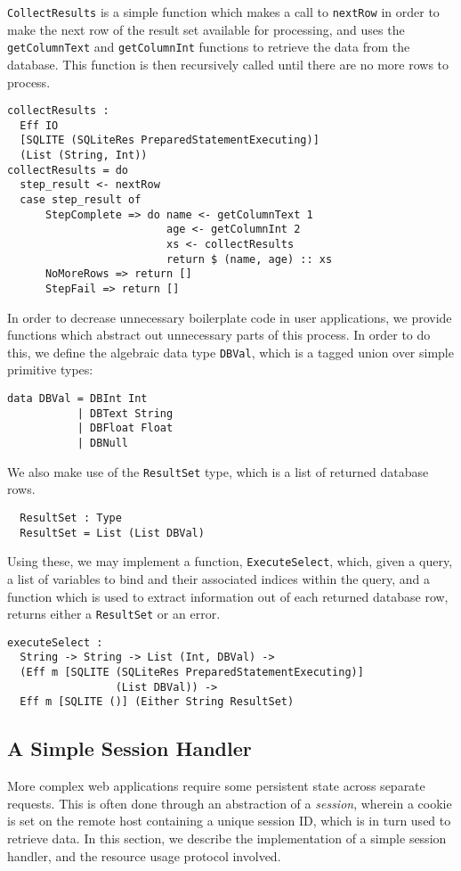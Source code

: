 \documentclass[preprint]{sigplanconf}
\begin{document}
\texttt{CollectResults} is a simple function which makes a call to \texttt{nextRow} in order to make the next row of the result set available for processing, and uses the \texttt{getColumnText} and \texttt{getColumnInt} functions to retrieve the data from the database. This function is then recursively called until there are no more rows to process.
\begin{Verbatim}
collectResults : 
  Eff IO 
  [SQLITE (SQLiteRes PreparedStatementExecuting)] 
  (List (String, Int))
collectResults = do
  step_result <- nextRow
  case step_result of
      StepComplete => do name <- getColumnText 1
                         age <- getColumnInt 2
                         xs <- collectResults
                         return $ (name, age) :: xs
      NoMoreRows => return []
      StepFail => return [] 
\end{Verbatim}
In order to decrease unnecessary boilerplate code in user applications, we provide functions which abstract out unnecessary parts of this process. In order to do this, we define the algebraic data type \texttt{DBVal}, which is a tagged union over simple primitive types:
\begin{Verbatim}
data DBVal = DBInt Int
           | DBText String
           | DBFloat Float
           | DBNull
\end{Verbatim}
We also make use of the \texttt{ResultSet} type, which is a list of returned database rows.
\begin{Verbatim}
  ResultSet : Type
  ResultSet = List (List DBVal)
\end{Verbatim}
Using these, we may implement a function, \texttt{ExecuteSelect}, which, given a query, a list of variables to bind and their associated indices within the query, and a function which is used to extract information out of each returned database row, returns either a \texttt{ResultSet} or an error.
\begin{Verbatim}
executeSelect : 
  String -> String -> List (Int, DBVal) -> 
  (Eff m [SQLITE (SQLiteRes PreparedStatementExecuting)] 
                 (List DBVal)) -> 
  Eff m [SQLITE ()] (Either String ResultSet)
\end{Verbatim}
\subsection{A Simple Session Handler}
More complex web applications require some persistent state across separate requests. This is often done through an abstraction of a \textit{session}, wherein a cookie is set on the remote host containing a unique session ID, which is in turn used to retrieve data. In this section, we describe the implementation of a simple session handler, and the resource usage protocol involved. 
\end{document}
